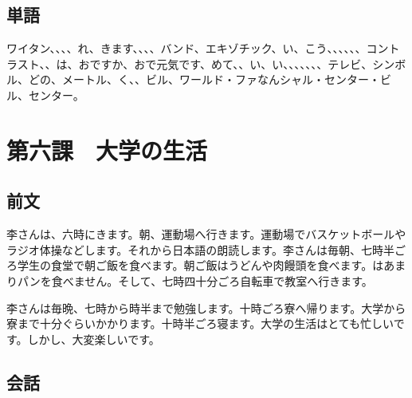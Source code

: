 \documentclass[a5j]{ltjtarticle}
\begin{document}
\subsection*{単語}

\begin{onehalfspace}
  ワイタン、、、、れ、きます、、、、バンド、エキゾチック、い、こう、、、、、、コントラスト、、は、おですか、おで元気です、めて、、い、い、、、、、、、テレビ、シンボル、どの、メートル、く、、ビル、ワールド・ファなんシャル・センター・ビル、センター。
\end{onehalfspace}

\section*{第六課　大学の生活}

\subsection*{前文}

李さんは、六時にきます。朝、運動場へ行きます。運動場でバスケットボールやラジオ体操などします。それから日本語の朗読します。李さんは毎朝、七時半ごろ学生の食堂で朝ご飯を食べます。朝ご飯はうどんや肉饅頭を食べます。はあまりパンを食べません。そして、七時四十分ごろ自転車で教室へ行きます。

李さんは毎晩、七時から時半まで勉強します。十時ごろ寮へ帰ります。大学から寮まで十分ぐらいかかります。十時半ごろ寝ます。大学の生活はとても忙しいです。しかし、大変楽しいです。

\subsection*{会話}
\end{document}
